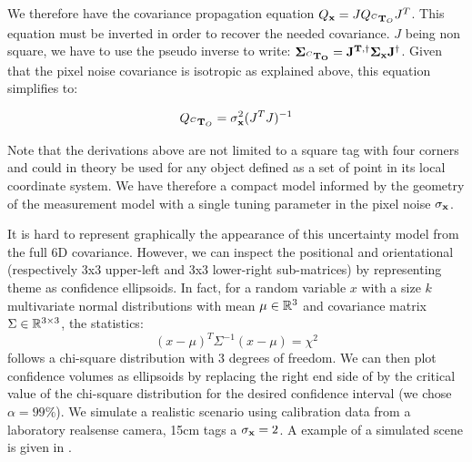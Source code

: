 We therefore have the covariance propagation equation $Q_{{\bf x}} = J Q_{\prescript{C}{}{{\bf T}}_{O}} J^T$. 
This equation must be inverted in order to recover the needed covariance. $J$ being non square, 
we have to use the pseudo inverse to write: $\bf \Sigma_{\prescript{C}{}{{\bf T}}_{O}} = J^{T,\dagger} \bf \Sigma_{{\bf x}} J^{\dagger}$. 
Given that the pixel noise covariance is isotropic as explained above, this equation simplifies to:

\begin{equation}
Q_{\prescript{C}{}{{\bf T}}_{O}} = \sigma_{{\bf x}}^2(J^T J)^{-1}    
\end{equation}

Note that the derivations above are not limited to a square tag with four corners and could in theory be used for any object defined as
a set of point in its local coordinate system. We have therefore a compact model informed by the geometry of the measurement model with 
a single tuning parameter in the pixel noise $\sigma_{\bf x}$.

It is hard to represent graphically the appearance of this uncertainty model from the full 6D covariance. However, we can inspect the positional and orientational
(respectively 3x3 upper-left and 3x3 lower-right sub-matrices) by representing theme as confidence ellipsoids.
In fact, for a random variable $x$ with a size $k$ multivariate normal distributions with mean $\mu \in \mathbb{R}^3$ and 
covariance matrix $\Sigma \in \mathbb{R}^{3 \times 3}$, the statistics:
%
\begin{equation}
    (x - \mu)^T \Sigma^{-1}(x - \mu) = \chi^2
    \label{eq:chi2}
\end{equation}
%
follows a chi-square distribution with 3 degrees of freedom. We can then plot confidence volumes as ellipsoids by replacing the right end side of  
 by the critical value of the chi-square distribution for the desired confidence interval (we chose $\alpha=99\%$). We simulate a 
realistic scenario using calibration data from a laboratory realsense camera, 15cm tags a $\sigma_{\bf x} = 2$. A example of a simulated scene is given
in . 

